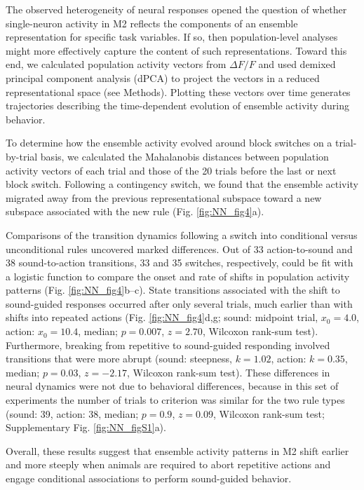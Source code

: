 The observed heterogeneity of neural responses opened the question of whether single-neuron activity in M2 reflects the components of an ensemble representation for specific task variables. If so, then population-level analyses might more effectively capture the content of such representations. Toward this end, we calculated population activity vectors from $\Delta F/F$ and used demixed principal component analysis (dPCA) \citep{machens2010functional,brendel2011demixed} to project the vectors in a reduced representational space (see Methods). Plotting these vectors over time generates trajectories describing the time-dependent evolution of ensemble activity during behavior. 

To determine how the ensemble activity evolved around block switches on a trial-by-trial basis, we calculated the Mahalanobis distances between population activity vectors of each trial and those of the 20 trials before the last or next block switch. Following a contingency switch, we found that the ensemble activity migrated away from the previous representational subspace toward a new subspace associated with the new rule (Fig. \ref{fig:NN_fig4}a). 


Comparisons of the transition dynamics following a switch into conditional versus unconditional rules uncovered marked differences. Out of 33 action-to-sound and 38 sound-to-action transitions, 33 and 35 switches, respectively, could be fit with a logistic function to compare the onset and rate of shifts in population activity patterns (Fig. \ref{fig:NN_fig4}b--c). State transitions associated with the shift to sound-guided responses occurred after only several trials, much earlier than with shifts into repeated actions (Fig. \ref{fig:NN_fig4}d,g; sound: midpoint trial, $x_0 = 4.0$, action: $x_0 = 10.4$, median; $p = 0.007$, $z = 2.70$, Wilcoxon rank-sum test). Furthermore, breaking from repetitive to sound-guided responding involved transitions that were more abrupt (sound: steepness, $k = 1.02$, action: $k = 0.35$, median; $p = 0.03$, $z = -2.17$, Wilcoxon rank-sum test). These differences in neural dynamics were not due to behavioral differences, because in this set of experiments the number of trials to criterion was similar for the two rule types (sound: 39, action: 38, median; $p = 0.9$, $z = 0.09$, Wilcoxon rank-sum test; Supplementary Fig. \ref{fig:NN_figS1}a). 

Overall, these results suggest that ensemble activity patterns in M2 shift earlier and more steeply when animals are required to abort repetitive actions and engage conditional associations to perform sound-guided behavior.

